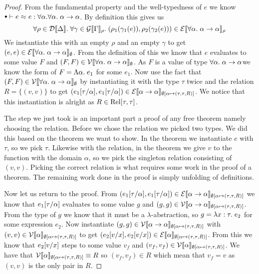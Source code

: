\begin{proof}
\newcommand{\aaa}{\ensuremath{\forall \alpha. \; \tarrow{\alpha}{\alpha}}}
From the fundamental property and the well-typedness of $e$ we know $\mtenv \vdash \lreq{e}{e} : \forall \alpha. \aaa$. By definition this gives us
\[
\forall \rho \in \dpred{\Delta}. \; \forall \gamma \in \gprep{\Gamma}. \; (\rho_1(\gamma_1(e)),\rho_2(\gamma_2(e))) \in \eprep{\aaa}
\]
\newcommand{\mt}{\ensuremath{\emptyset}}
We instantiate this with an empty $\rho$ and an empty $\gamma$ to get $(e,e) \in \eprep[\mt]{\aaa}$. From the definition of this we know that $e$ evaluates to some value $F$ and $(F,F) \in \vprep[\mt]{\aaa}$. As $F$ is a value of type \aaa we know the form of $F=\Lambda \alpha . \; e_1$ for some $e_1$. Now use the fact that $(F,F) \in \vprep[\mt]{\aaa}$ by instantiating it with the type $\tau$ twice and the relation $R=\{(v,v)\}$ to get 
\newcommand{\env}{\ensuremath{\extsub{\mt}{\alpha}{(\tau,\tau,R)}}}
\newcommand{\taa}{\ensuremath{\tarrow{\alpha}{\alpha}}}
$(\subst{e_1}{\tau}{\alpha},\subst{e_1}{\tau}{\alpha})\in \eprep[\env]{\taa}$. We notice that this instantiation is alright as $R \in \operatorname{Rel}[\tau,\tau]$.

The step we just took is an important part a proof of any free theorem namely choosing the relation. Before we chose the relation we picked two types. We did this based on the theorem we want to show. In the theorem we instantiate $e$ with $\tau$, so we pick $\tau$. Likewise with the relation, in the theorem we give $v$ to the function with the domain $\alpha$, so we pick the singleton relation consisting of $(v,v)$. Picking the correct relation is what requires some work in the proof of a theorem. The remaining work done in the proof is simply unfolding of definitions.

Now let us return to the proof. From $(\subst{e_1}{\tau}{\alpha},\subst{e_1}{\tau}{\alpha})\in \eprep[\env]{\taa}$ we know that $e_1[\tau/\alpha]$ evaluates to some value $g$ and $(g,g)\in \vprep[\env]{\taa}$. From the type of $g$ we know that it must be a $\lambda$-abstraction, so $g=\lambda x : \tau . \; e_2$ for some expression $e_2$. Now instantiate $(g,g)\in \vprep[\env]{\taa}$ with $(v,v) \in \vprep[\env]{\alpha}$ to get $(\subst{e_2}{v}{x},\subst{e_2}{v}{x}) \in \eprep[\env]{\alpha}$. From this we know that $e_2[v/x]$ steps to some value $v_f$ and $(v_f,v_f) \in \vprep[\env]{\alpha}$. We have that $\vprep[\env]{\alpha} \equiv R$ so $(v_f,v_f) \in R$ which mean that $v_f = v$ as $(v,v)$ is the only pair in $R$.


\end{proof}

